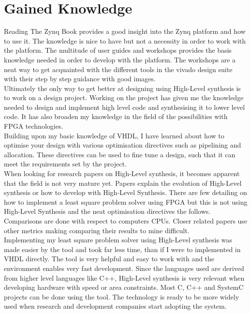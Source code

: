 \chapter{Gained Knowledge}
Reading The Zynq Book provides a good insight into the Zynq platform and how to use it. The knowledge is nice to have but not a necessity in order to work with the platform. The multitude of user guides and workshops provides the basis knowledge needed in order to develop with the platform. The workshops are a neat way to get acquainted with the different tools in the vivado design suite with their step by step guidance with good images. \\

Ultimately the only way to get better at designing using High-Level synthesis is to work on a design project. Working on the project has given me the knowledge needed to design and implement high level code and synthesising it to lower level code. It has also broaden my knowledge in the field of the possibilities with FPGA technologies. \\
Building upon my basic knowledge of VHDL, I have learned about how to optimise your design with various optimisation directives such as pipelining and allocation. These directives can be used to fine tune a design, such that it can meet the requirements set by the project. \\

When looking for research papers on High-Level synthesis, it becomes apparent that the field is not very mature yet. Papers explain the evolution of High-Level synthesis\cite{martin2009high} or how to develop with High-Level Synthesis\cite{cong2011high}. There are few detailing on how to implement a least square problem solver using FPGA\cite{yang2009fpga} but this is not using High-Level Synthesis and the neat optimisation directives the follows. Comparisons are done with respect to computers CPUs. Closer related papers use other metrics making comparing their results to mine difficult\cite{skalicky2014performance}.\\

Implementing my least square problem solver using High-Level synthesis was made easier by the tool and took far less time, than if I were to implemented in VHDL directly. The tool is very helpful and easy to work with and the environment enables very fast development. Since the languages used are derived from higher level languages like C++, High-Level synthesis is very relevant when developing hardware with speed or area constraints. Most C, C++ and SystemC projects can be done using the tool. The technology is ready to be more widely used when research and development companies start adopting the system.